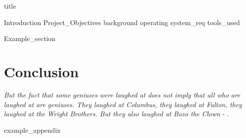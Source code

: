 \documentclass{article}
\begin{document}
{title}

\frontmatter

\tableofcontents

\listoffigures
\listoftables

\mainmatter
{Introduction}
{Project_Objectives}
{background}
{operating}
{system_req}
{tools_used}

{Example_section}

\section{Conclusion}
\textit{But the fact that some geniuses were laughed at does not imply that all who are laughed at are geniuses. They laughed at Columbus, they laughed at Fulton, they laughed at the Wright Brothers. But they also laughed at Bozo the Clown} -  \textcite{sagan_1993}.

\newpage
\printbibliography[heading = bibintoc, title = Bibliography]    %

\addappendix
{example_appendix}

\end{document}
